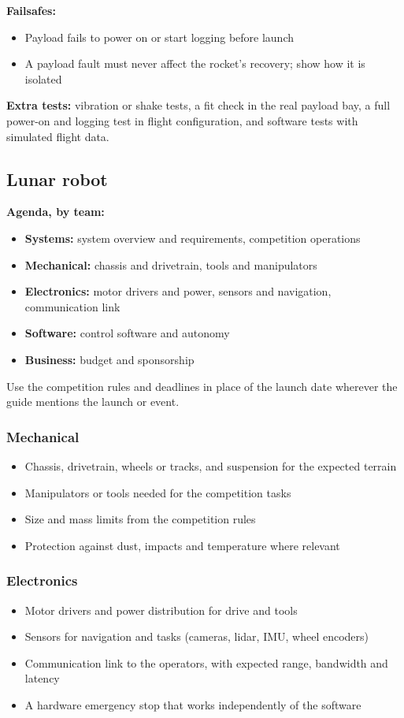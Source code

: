 \documentclass{../../Common/Latex/Templates/rapport}
\renewcommand{\vsubsection}[1]{\subsection{#1}}
\begin{document}
\noindent\textbf{Failsafes:}
\begin{itemize}
  \item Payload fails to power on or start logging before launch
  \item A payload fault must never affect the rocket's recovery; show how it is isolated
\end{itemize}

\noindent\textbf{Extra tests:} vibration or shake tests, a fit check in the real payload bay, a full power-on and logging test in flight configuration, and software tests with simulated flight data.

\vsubsection{Lunar robot}
\noindent\textbf{Agenda, by team:}
\begin{itemize}
  \item \textbf{Systems:} system overview and requirements, competition operations
  \item \textbf{Mechanical:} chassis and drivetrain, tools and manipulators
  \item \textbf{Electronics:} motor drivers and power, sensors and navigation, communication link
  \item \textbf{Software:} control software and autonomy
  \item \textbf{Business:} budget and sponsorship
\end{itemize}

Use the competition rules and deadlines in place of the launch date wherever the guide mentions the launch or event.

\subsubsection*{Mechanical}
\begin{itemize}
  \item Chassis, drivetrain, wheels or tracks, and suspension for the expected terrain
  \item Manipulators or tools needed for the competition tasks
  \item Size and mass limits from the competition rules
  \item Protection against dust, impacts and temperature where relevant
\end{itemize}

\subsubsection*{Electronics}
\begin{itemize}
  \item Motor drivers and power distribution for drive and tools
  \item Sensors for navigation and tasks (cameras, lidar, IMU, wheel encoders)
  \item Communication link to the operators, with expected range, bandwidth and latency
  \item A hardware emergency stop that works independently of the software
\end{itemize}
\end{document}
